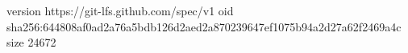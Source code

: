 version https://git-lfs.github.com/spec/v1
oid sha256:644808af0ad2a76a5bdb126d2aed2a870239647ef1075b94a2d27a62f2469a4c
size 24672

